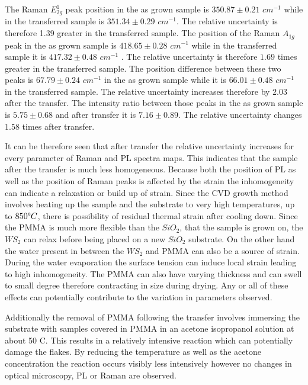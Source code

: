 The Raman $E^1_{2g}$ peak position in the as grown sample is $350.87 \pm 0.21$ $cm^{-1}$ while in the transferred sample is $351.34 \pm 0.29$ $cm^{-1}$. The relative uncertainty is therefore 1.39 greater in the transferred sample. The position of the Raman $A_{1g}$ peak in the as grown sample is $418.65 \pm 0.28$ $cm^{-1}$ while in the transferred sample it is $417.32 \pm 0.48$ $cm^{-1}$ . The relative uncertainty is therefore $1.69$ times greater in the transferred sample. The position difference between these two peaks is $67.79 \pm 0.24$ $cm^{-1}$ in the as grown sample while it is $66.01 \pm 0.48$ $cm^{-1}$ in the transferred sample. The relative uncertainty increases therefore by $2.03$ after the transfer. The intensity ratio between those peaks in the as grown sample is $5.75 \pm 0.68$ and after transfer it is $7.16 \pm 0.89$. The relative uncertainty changes $1.58$ times after transfer.
	
It can be therefore seen that after transfer the relative uncertainty increases for every parameter of Raman and PL spectra maps. This indicates that the sample after the transfer is much less homogeneous. Because both the position of PL as well as the position of Raman peaks is affected by the strain the inhomogeneity can indicate a relaxation or build up of strain. Since the CVD growth method involves heating up the sample and the substrate to very high temperatures, up to $850 {\degree}C$, there is possibility of residual thermal strain after cooling down. Since the PMMA is much more flexible than the $SiO_2$, that the sample is grown on, the $WS_2$ can relax before being placed on a new $SiO_2$ substrate. On the other hand the water present in between the $WS_2$ and PMMA can also be a source of strain. During the water evaporation the surface tension can induce local strain leading to high inhomogeneity. The PMMA can also have varying thickness and can swell to small degree therefore contracting in size during drying. Any or all of these effects can potentially contribute to the variation in parameters observed.

Additionally the removal of PMMA following the transfer involves immersing the substrate with samples covered in PMMA in an acetone isopropanol solution at about 50 {\degree}C. This results in a relatively intensive reaction which can potentially damage the flakes. By reducing the temperature as well as the acetone concentration the reaction occurs visibly less intensively however no changes in optical microscopy, PL or Raman are observed.
	
